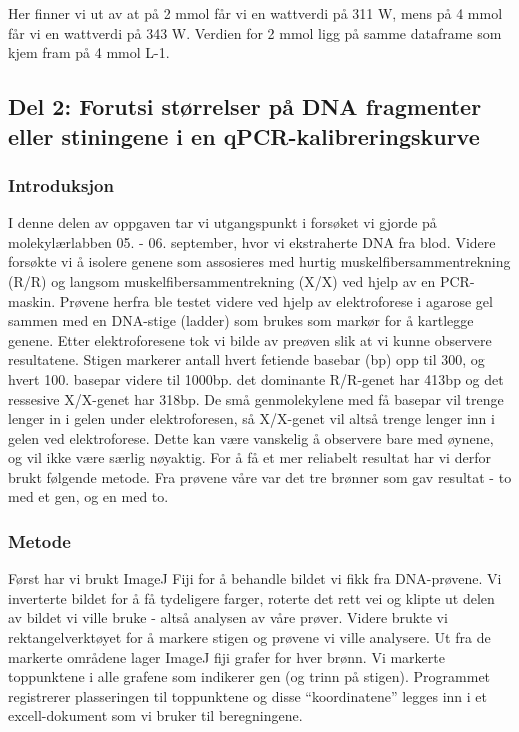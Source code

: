 \documentclass[
  letterpaper,
  DIV=11,
  numbers=noendperiod]{scrartcl}
\begin{document}
Her finner vi ut av at på 2 mmol får vi en wattverdi på 311 W, mens på 4
mmol får vi en wattverdi på 343 W. Verdien for 2 mmol ligg på samme
dataframe som kjem fram på 4 mmol L-1.

\subsection{Del 2: Forutsi størrelser på DNA fragmenter eller stiningene
i en
qPCR-kalibreringskurve}\label{del-2-forutsi-stuxf8rrelser-puxe5-dna-fragmenter-eller-stiningene-i-en-qpcr-kalibreringskurve}

\subsubsection{Introduksjon}\label{introduksjon-1}

I denne delen av oppgaven tar vi utgangspunkt i forsøket vi gjorde på
molekylærlabben 05. - 06. september, hvor vi ekstraherte DNA fra blod.
Videre forsøkte vi å isolere genene som assosieres med hurtig
muskelfibersammentrekning (R/R) og langsom muskelfibersammentrekning
(X/X) ved hjelp av en PCR-maskin. Prøvene herfra ble testet videre ved
hjelp av elektroforese i agarose gel sammen med en DNA-stige (ladder)
som brukes som markør for å kartlegge genene. Etter elektroforesene tok
vi bilde av preøven slik at vi kunne observere resultatene. Stigen
markerer antall hvert fetiende basebar (bp) opp til 300, og hvert 100.
basepar videre til 1000bp. det dominante R/R-genet har 413bp og det
ressesive X/X-genet har 318bp. De små genmolekylene med få basepar vil
trenge lenger in i gelen under elektroforesen, så X/X-genet vil altså
trenge lenger inn i gelen ved elektroforese. Dette kan være vanskelig å
observere bare med øynene, og vil ikke være særlig nøyaktig. For å få et
mer reliabelt resultat har vi derfor brukt følgende metode. Fra prøvene
våre var det tre brønner som gav resultat - to med et gen, og en med to.

\subsubsection{Metode}\label{metode-1}

Først har vi brukt ImageJ Fiji for å behandle bildet vi fikk fra
DNA-prøvene. Vi inverterte bildet for å få tydeligere farger, roterte
det rett vei og klipte ut delen av bildet vi ville bruke - altså
analysen av våre prøver. Videre brukte vi rektangelverktøyet for å
markere stigen og prøvene vi ville analysere. Ut fra de markerte
områdene lager ImageJ fiji grafer for hver brønn. Vi markerte
toppunktene i alle grafene som indikerer gen (og trinn på stigen).
Programmet registrerer plasseringen til toppunktene og disse
``koordinatene'' legges inn i et excell-dokument som vi bruker til
beregningene.
\end{document}
